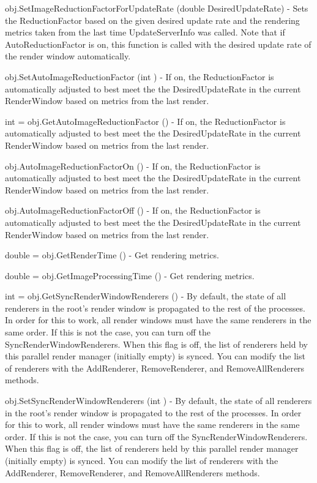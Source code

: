 \begin{DoxyItemize}
\item {\ttfamily obj.\-Set\-Image\-Reduction\-Factor\-For\-Update\-Rate (double Desired\-Update\-Rate)} -\/ Sets the Reduction\-Factor based on the given desired update rate and the rendering metrics taken from the last time Update\-Server\-Info was called. Note that if Auto\-Reduction\-Factor is on, this function is called with the desired update rate of the render window automatically.  
\item {\ttfamily obj.\-Set\-Auto\-Image\-Reduction\-Factor (int )} -\/ If on, the Reduction\-Factor is automatically adjusted to best meet the the Desired\-Update\-Rate in the current Render\-Window based on metrics from the last render.  
\item {\ttfamily int = obj.\-Get\-Auto\-Image\-Reduction\-Factor ()} -\/ If on, the Reduction\-Factor is automatically adjusted to best meet the the Desired\-Update\-Rate in the current Render\-Window based on metrics from the last render.  
\item {\ttfamily obj.\-Auto\-Image\-Reduction\-Factor\-On ()} -\/ If on, the Reduction\-Factor is automatically adjusted to best meet the the Desired\-Update\-Rate in the current Render\-Window based on metrics from the last render.  
\item {\ttfamily obj.\-Auto\-Image\-Reduction\-Factor\-Off ()} -\/ If on, the Reduction\-Factor is automatically adjusted to best meet the the Desired\-Update\-Rate in the current Render\-Window based on metrics from the last render.  
\item {\ttfamily double = obj.\-Get\-Render\-Time ()} -\/ Get rendering metrics.  
\item {\ttfamily double = obj.\-Get\-Image\-Processing\-Time ()} -\/ Get rendering metrics.  
\item {\ttfamily int = obj.\-Get\-Sync\-Render\-Window\-Renderers ()} -\/ By default, the state of all renderers in the root's render window is propagated to the rest of the processes. In order for this to work, all render windows must have the same renderers in the same order. If this is not the case, you can turn off the Sync\-Render\-Window\-Renderers. When this flag is off, the list of renderers held by this parallel render manager (initially empty) is synced. You can modify the list of renderers with the Add\-Renderer, Remove\-Renderer, and Remove\-All\-Renderers methods.  
\item {\ttfamily obj.\-Set\-Sync\-Render\-Window\-Renderers (int )} -\/ By default, the state of all renderers in the root's render window is propagated to the rest of the processes. In order for this to work, all render windows must have the same renderers in the same order. If this is not the case, you can turn off the Sync\-Render\-Window\-Renderers. When this flag is off, the list of renderers held by this parallel render manager (initially empty) is synced. You can modify the list of renderers with the Add\-Renderer, Remove\-Renderer, and Remove\-All\-Renderers methods.  

\end{DoxyItemize}
